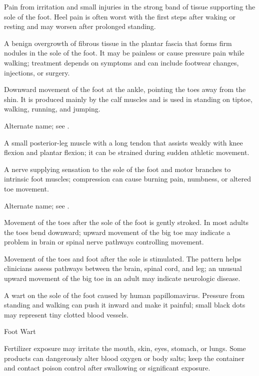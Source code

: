  Pain from irritation and small injuries in the strong band of tissue supporting the sole of the foot. Heel pain is often worst with the first steps after waking or resting and may worsen after prolonged standing.

 A benign overgrowth of fibrous tissue in the plantar fascia that forms firm nodules in the sole of the foot. It may be painless or cause pressure pain while walking; treatment depends on symptoms and can include footwear changes, injections, or surgery.

 Downward movement of the foot at the ankle, pointing the toes away from the shin. It is produced mainly by the calf muscles and is used in standing on tiptoe, walking, running, and jumping.

 Alternate name; see .

 A small posterior-leg muscle with a long tendon that assists weakly with knee flexion and plantar flexion; it can be strained during sudden athletic movement.

 A nerve supplying sensation to the sole of the foot and motor branches to intrinsic foot muscles; compression can cause burning pain, numbness, or altered toe movement.

 Alternate name; see .

 Movement of the toes after the sole of the foot is gently stroked. In most adults the toes bend downward; upward movement of the big toe may indicate a problem in brain or spinal nerve pathways controlling movement.

 Movement of the toes and foot after the sole is stimulated. The pattern helps clinicians assess pathways between the brain, spinal cord, and leg; an unusual upward movement of the big toe in an adult may indicate neurologic disease.

 A wart on the sole of the foot caused by human papillomavirus. Pressure from standing and walking can push it inward and make it painful; small black dots may represent tiny clotted blood vessels.

\synonyms
Foot Wart

 Fertilizer exposure may irritate the mouth, skin, eyes, stomach, or lungs. Some products can dangerously alter blood oxygen or body salts; keep the container and contact poison control after swallowing or significant exposure.

